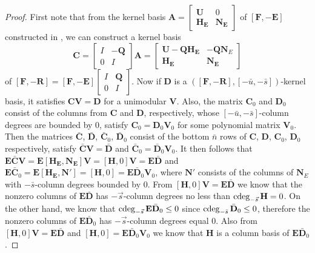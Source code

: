 \begin{proof}
First note that from the kernel basis $\mathbf{A}=\begin{bmatrix}\mathbf{U} & 0\\
\mathbf{H}_{\mathbf{E}} & \mathbf{N}_{\mathbf{E}}
\end{bmatrix}$ of $\left[\mathbf{F},-\mathbf{E}\right]$ constructed in ,
we can construct a kernel basis 
\[
\mathbf{C}=\begin{bmatrix}I & -\mathbf{Q}\\
0 & I
\end{bmatrix}\mathbf{A}=\begin{bmatrix}\mathbf{U}-\mathbf{Q}\mathbf{H}_{\mathbf{E}} & -\mathbf{Q}\mathbf{N}_{E}\\
\mathbf{H}_{\mathbf{E}} & \mathbf{N}_{\mathbf{E}}
\end{bmatrix}
\]
 of $\left[\mathbf{F},-\mathbf{R}\right]=\left[\mathbf{F},-\mathbf{E}\right]\begin{bmatrix}I & \mathbf{Q}\\
0 & I
\end{bmatrix}$. Now if $\mathbf{D}$ is a $\left(\left[\mathbf{F},-\mathbf{R}\right],\left[-\bar{u},-\bar{s}\right]\right)$-kernel
basis, it satisfies $\mathbf{C}\mathbf{V}=\mathbf{D}$ for a unimodular
$\mathbf{V}$. Also, the matrix $\mathbf{C}_{0}$ and $\mathbf{D}_{0}$
consist of the columns from $\mathbf{C}$ and $\mathbf{D}$, respectively,
whose $\left[-\bar{u},-\bar{s}\right]$-column degrees are bounded
by $0$, satisfy $\mathbf{C}_{0}=\mathbf{D}_{0}\mathbf{V}_{0}$ for
some polynomial matrix $\mathbf{V}_{0}$. Then the matrices $\bar{\mathbf{C}}$,
$\bar{\mathbf{D}}$, $\bar{\mathbf{C}}_{0}$, $\bar{\mathbf{D}}_{0}$
consist of the bottom $\bar{n}$ rows of $\mathbf{C}$, $\mathbf{D}$,
$\mathbf{C}_{0}$, $\mathbf{D}_{0}$ respectively, satisfy $\bar{\mathbf{C}}\mathbf{V}=\bar{\mathbf{D}}$
and $\bar{\mathbf{C}}_{0}=\bar{\mathbf{D}}_{0}\mathbf{V}_{0}$. It
then follows that $\mathbf{E}\bar{\mathbf{C}}\mathbf{V}=\mathbf{E}\left[\mathbf{H}_{\mathbf{E}},\mathbf{N}_{\mathbf{E}}\right]\mathbf{V}=\left[\mathbf{H},0\right]\mathbf{V}=\mathbf{E}\bar{\mathbf{D}}$
and $\mathbf{E}\bar{\mathbf{C}}_{0}=\mathbf{E}\left[\mathbf{H}_{\mathbf{E}},\mathbf{N}'\right]=\left[\mathbf{H},0\right]=\mathbf{E}\bar{\mathbf{D}}_{0}\mathbf{V}_{0}$,
where $\mathbf{N}'$ consists of the columns of $\mathbf{N}_{E}$
with $-\bar{s}$-column degrees bounded by 0. From $\left[\mathbf{H},0\right]\mathbf{V}=\mathbf{E}\bar{\mathbf{D}}$
we know that the nonzero columns of $\mathbf{E}\bar{\mathbf{D}}$
has $-\vec{s}$-column degrees no less than $\cdeg_{-\vec{s}}\mathbf{H}=0$.
On the other hand, we know that $\cdeg_{-\vec{s}}\mathbf{E}\bar{\mathbf{D}}_{0}\le0$
since $\cdeg_{-\bar{s}}\bar{\mathbf{D}}_{0}\le0$, therefore the nonzero
columns of $\mathbf{E}\bar{\mathbf{D}}_{0}$ has $-\vec{s}$-column
degrees equal $0$. Also from $\left[\mathbf{H},0\right]\mathbf{V}=\mathbf{E}\bar{\mathbf{D}}$
and $\left[\mathbf{H},0\right]=\mathbf{E}\bar{\mathbf{D}}_{0}\mathbf{V}_{0}$
we know that $\mathbf{H}$ is a column basis of $\mathbf{E}\bar{\mathbf{D}}_{0}$.
\end{proof}
